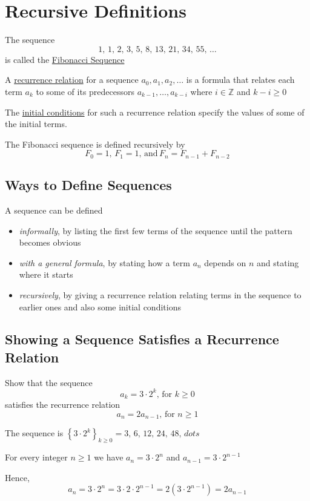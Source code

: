 \section{Recursive Definitions}
\begin{example}
    The sequence $$1,\,1,\,2,\,3,\,5,\,8,\,13,\,21,\,34,\,55,\,\dots$$ is called the \underline{Fibonacci Sequence}
\end{example}

\begin{definition}
    A \underline{recurrence relation} for a sequence $a_0,a_1,a_2,\dots$ is a formula that relates each term $a_k$ to some of its predecessors $a_{k-1},\dots,a_{k-i}$ where $i\in\mathbb Z$ and $k-i \geq 0$

    The \underline{initial conditions} for such a recurrence relation specify the values of some of the initial terms.
\end{definition}

\begin{example}
The Fibonacci sequence is defined recursively by $$F_0 = 1,\, F_1 = 1,\,\text{and}\,F_n = F_{n-1} + F_{n-2}$$
\end{example}

\subsection{Ways to Define Sequences}
A sequence can be defined
\begin{itemize}
    \item \emph{informally}, by listing the first few terms of the sequence until the pattern becomes obvious
    \item \emph{with a general formula}, by stating how a term $a_n$ depends on $n$ and stating where it starts
    \item \emph{recursively}, by giving a recurrence relation relating terms in the sequence to earlier ones and also some initial conditions
\end{itemize}

\subsection{Showing a Sequence Satisfies a Recurrence Relation}
\begin{example}
Show that the sequence $$a_k = 3\cdot 2^k,\,\text{for }k\geq 0$$ satisfies the recurrence relation $$a_n = 2a_{n-1},\,\text{for }n\geq 1$$

The sequence is $\displaystyle \left\{3\cdot 2^k\right\}_{k\geq 0} = 3,\,6,\,12,\,24,\,48,\,dots$

For every integer $n\geq 1$ we have $a_n = 3\cdot 2^n$ and $a_{n-1} = 3\cdot 2^{n-1}$

Hence, $$a_n = 3\cdot 2^n = 3\cdot 2\cdot 2^{n-1} = 2 (3\cdot 2^{n-1}) = 2 a_{n-1}$$
\end{example}

